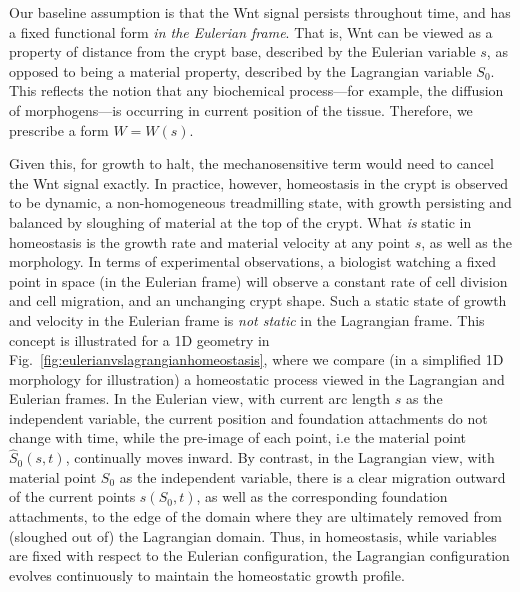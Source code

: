 Our baseline assumption is that the Wnt signal persists throughout time, and has a fixed functional form {\it in the Eulerian frame}. That is, Wnt can be viewed as a property of distance from the crypt base, described by the Eulerian variable $s$, as opposed to being a material property, described by the Lagrangian variable $S_0$. This reflects the notion that any biochemical process---for example, the diffusion of morphogens---is occurring in current position of the tissue. Therefore, we prescribe a form $W=W(s)$.

Given this, for growth to halt, the mechanosensitive term would need to cancel the Wnt signal exactly. In practice, however, homeostasis in the crypt is observed to be dynamic, a non-homogeneous treadmilling state, with growth persisting and balanced by sloughing of material at the top of the crypt. What {\it is} static in homeostasis is the growth rate and material velocity at any point $s$, as well as the morphology. In terms of experimental observations, a biologist watching a fixed point in space (in the Eulerian frame) will observe a constant rate of cell division and cell migration, and an unchanging crypt shape. Such a static state of growth and velocity in the Eulerian frame is {\it not static} in the Lagrangian frame. This concept is illustrated for a 1D geometry in Fig.\ \ref{fig:eulerianvslagrangianhomeostasis}, where we compare (in a simplified 1D morphology for illustration) a homeostatic process viewed in the Lagrangian and Eulerian frames. In the Eulerian view, with current arc length $s$ as the independent variable, the current position and foundation attachments do not change with time, while the pre-image of each point, i.e the material point $\hat{S}_0(s,t)$, continually moves inward. By contrast, in the Lagrangian view, with material point $S_0$ as the independent variable, there is a clear migration outward of the current points $s(S_0, t)$, as well as the corresponding foundation attachments, to the edge of the domain where they are ultimately removed from (sloughed out of) the Lagrangian domain.  Thus, in homeostasis, while variables are fixed with respect to the Eulerian configuration, the Lagrangian configuration evolves continuously to maintain the homeostatic growth profile. 


